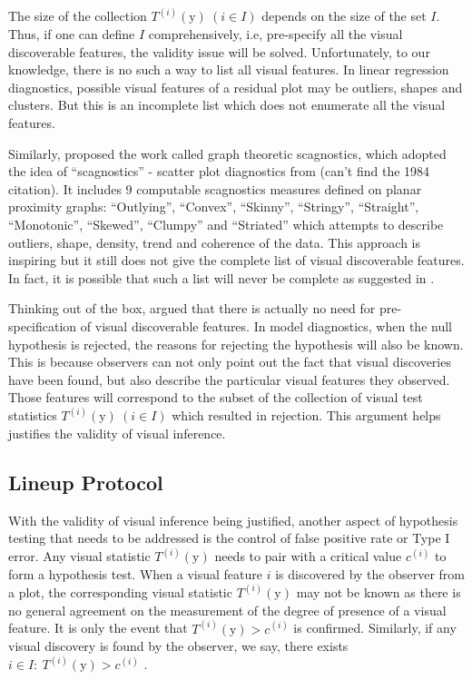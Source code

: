 \documentclass{monashthesis}
\theoremstyle{definition}
\theoremstyle{definition}
\theoremstyle{definition}
\theoremstyle{definition}
\theoremstyle{remark}
\begin{document}
The size of the collection \(T^{(i)}(\boldsymbol{\mathrm{y}})~(i \in I)\) depends on the size of the set \(I\). Thus, if one can define \(I\) comprehensively, i.e, pre-specify all the visual discoverable features, the validity issue will be solved. Unfortunately, to our knowledge, there is no such a way to list all visual features. In linear regression diagnostics, possible visual features of a residual plot may be outliers, shapes and clusters. But this is an incomplete list which does not enumerate all the visual features.

Similarly, \textcite{wilkinson_graph-theoretic_2005} proposed the work called graph theoretic scagnostics, which adopted the idea of ``scagnostics'' - scatter plot diagnostics from (can't find the 1984 citation). It includes 9 computable scagnostics measures defined on planar proximity graphs: ``Outlying'', ``Convex'', ``Skinny'', ``Stringy'', ``Straight'', ``Monotonic'', ``Skewed'', ``Clumpy'' and ``Striated'' which attempts to describe outliers, shape, density, trend and coherence of the data. This approach is inspiring but it still does not give the complete list of visual discoverable features. In fact, it is possible that such a list will never be complete as suggested in \textcite{buja_statistical_2009}.

Thinking out of the box, \textcite{buja_statistical_2009} argued that there is actually no need for pre-specification of visual discoverable features. In model diagnostics, when the null hypothesis is rejected, the reasons for rejecting the hypothesis will also be known. This is because observers can not only point out the fact that visual discoveries have been found, but also describe the particular visual features they observed. Those features will correspond to the subset of the collection of visual test statistics \(T^{(i)}(\boldsymbol{\mathrm{y}})~(i \in I)\) which resulted in rejection. This argument helps justifies the validity of visual inference.

\hypertarget{lineup-protocol-1}{%
\subsection{Lineup Protocol}\label{lineup-protocol-1}}

With the validity of visual inference being justified, another aspect of hypothesis testing that needs to be addressed is the control of false positive rate or Type I error. Any visual statistic \(T^{(i)}(\boldsymbol{\mathrm{y}})\) needs to pair with a critical value \(c^{(i)}\) to form a hypothesis test. When a visual feature \(i\) is discovered by the observer from a plot, the corresponding visual statistic \(T^{(i)}(\boldsymbol{\mathrm{y}})\) may not be known as there is no general agreement on the measurement of the degree of presence of a visual feature. It is only the event that \(T^{(i)}(\boldsymbol{\mathrm{y}}) > c^{(i)}\) is confirmed. Similarly, if any visual discovery is found by the observer, we say, there exists \(i \in I:~T^{(i)}(\boldsymbol{\mathrm{y}}) > c^{(i)}\) \autocite{buja_statistical_2009}.
\end{document}
